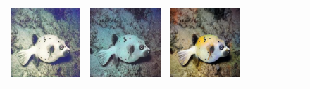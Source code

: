 \begin{figure}[t]
\begin{center}
\begin{tabular}{ccccccccc}
			\includegraphics[width = 0.10\linewidth,height=0.10\linewidth]{figures/ch3/compare/EUVP/STSC/264318_n02655020_17544.JPEG}  & \hspace{-0.40cm}
			\includegraphics[width = 0.10\linewidth,height=0.10\linewidth]{figures/ch3/compare/EUVP/Ushape/264318_n02655020_17544.JPEG}& \hspace{-0.40cm} 
            \includegraphics[width = 0.10\linewidth,height=0.10\linewidth]{figures/ch3/compare/EUVP/Ours/264318_n02655020_17544..png}  \\
                

\end{tabular}
\end{center}
\end{figure}
